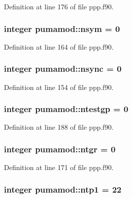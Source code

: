 \-Definition at line 176 of file ppp.\-f90.

\hypertarget{classpumamod_a688f0876bf83c724d71700aa98835d6e}{
\subsubsection[{nsym}]{\setlength{\rightskip}{0pt plus 5cm}integer {\bf pumamod\-::nsym} = 0}}
\label{classpumamod_a688f0876bf83c724d71700aa98835d6e}


\-Definition at line 164 of file ppp.\-f90.

\hypertarget{classpumamod_aed2697cde4ae8454c1807fba6dece761}{
\subsubsection[{nsync}]{\setlength{\rightskip}{0pt plus 5cm}integer {\bf pumamod\-::nsync} = 0}}
\label{classpumamod_aed2697cde4ae8454c1807fba6dece761}


\-Definition at line 154 of file ppp.\-f90.

\hypertarget{classpumamod_a57b5b04397af1927fb03ce17e7376949}{
\subsubsection[{ntestgp}]{\setlength{\rightskip}{0pt plus 5cm}integer {\bf pumamod\-::ntestgp} = 0}}
\label{classpumamod_a57b5b04397af1927fb03ce17e7376949}


\-Definition at line 188 of file ppp.\-f90.

\hypertarget{classpumamod_a57aac3712e7ae661fa9dd04fe6495ff0}{
\subsubsection[{ntgr}]{\setlength{\rightskip}{0pt plus 5cm}integer {\bf pumamod\-::ntgr} = 0}}
\label{classpumamod_a57aac3712e7ae661fa9dd04fe6495ff0}


\-Definition at line 171 of file ppp.\-f90.

\hypertarget{classpumamod_a3f387b7be204f54ea75b61f0be441430}{
\subsubsection[{ntp1}]{\setlength{\rightskip}{0pt plus 5cm}integer {\bf pumamod\-::ntp1} = 22}}
\label{classpumamod_a3f387b7be204f54ea75b61f0be441430}



